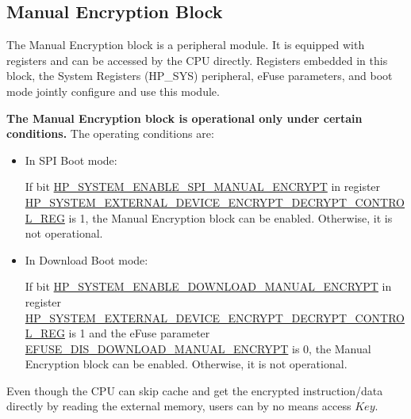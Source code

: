 \documentclass[main\_\_EN.tex]{subfiles}
\begin{document}
\subsection{Manual Encryption Block}

The Manual Encryption block is a peripheral module. It is equipped with registers and can be accessed by the CPU directly. Registers embedded in this block, the System Registers (HP\_SYS) peripheral, eFuse parameters, and boot mode jointly configure and use this module.

\textbf{ The Manual Encryption block is operational only under certain conditions.} The operating conditions are:

\begin{itemize}

    \item In SPI Boot mode:
    
    If bit \hyperref[fielddesc:HPSYSTEMENABLESPIMANUALENCRYPT]{HP\_SYSTEM\_ENABLE\_SPI\_MANUAL\_ENCRYPT} in register\\ \hyperref[regdesc:HPSYSTEMEXTERNALDEVICEENCRYPTDECRYPTCONTROLREG]{HP\_SYSTEM\_EXTERNAL\_DEVICE\_ENCRYPT\_DECRYPT\_CONTROL\_REG} is 1, the Manual Encryption block can be enabled. Otherwise, it is not operational.
    
    \item In Download Boot mode:
    
    If bit \hyperref[fielddesc:HPSYSTEMENABLEDOWNLOADMANUALENCRYPT]{HP\_SYSTEM\_ENABLE\_DOWNLOAD\_MANUAL\_ENCRYPT} in register\\ \hyperref[regdesc:HPSYSTEMEXTERNALDEVICEENCRYPTDECRYPTCONTROLREG]{HP\_SYSTEM\_EXTERNAL\_DEVICE\_ENCRYPT\_DECRYPT\_CONTROL\_REG} is 1 and the eFuse parameter\\ \hyperref[fielddesc:EFUSEDISDOWNLOADMANUALENCRYPT]{EFUSE\_DIS\_DOWNLOAD\_MANUAL\_ENCRYPT} is 0, the Manual Encryption block can be enabled. Otherwise, it is not operational.
    
\end{itemize}

\begin{tiplisting}
\vspace{-2em}
\begin{enumerate}
Even though the CPU can skip cache and get the encrypted instruction/data directly by reading the external memory, users can by no means access \begin{math}\mathit{Key}\end{math}.
\end{enumerate}
\end{tiplisting}
\end{document}
